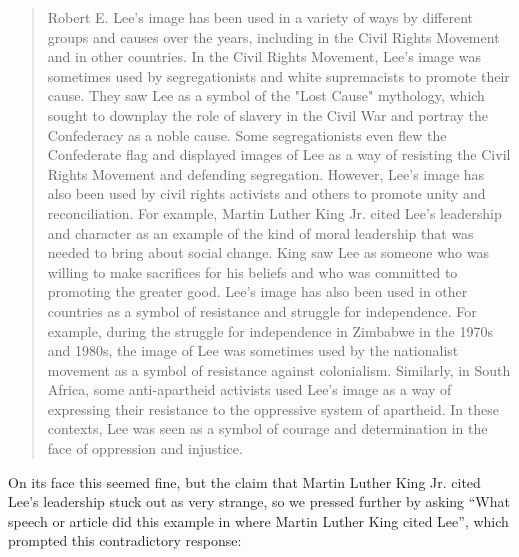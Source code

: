 \documentclass[letterpaper, 10pt, conference]{ieeeconf}
\begin{document}
    \begin{quote}
        
    Robert E. Lee's image has been used in a variety of ways by different groups and causes over the years, including in the
    Civil Rights Movement and in other countries. In the Civil Rights Movement, Lee's image was sometimes used by
    segregationists and white supremacists to promote their cause. They saw Lee as a symbol of the "Lost Cause" mythology,
    which sought to downplay the role of slavery in the Civil War and portray the Confederacy as a noble cause. Some
    segregationists even flew the Confederate flag and displayed images of Lee as a way of resisting the Civil Rights
    Movement and defending segregation. However, Lee's image has also been used by civil rights activists and others to
    promote unity and reconciliation. For example, Martin Luther King Jr. cited Lee's leadership and character as an
    example of the kind of moral leadership that was needed to bring about social change. King saw Lee as someone who
    was willing to make sacrifices for his beliefs and who was committed to promoting the greater good. Lee's image has
    also been used in other countries as a symbol of resistance and struggle for independence. For example, during the
    struggle for independence in Zimbabwe in the 1970s and 1980s, the image of Lee was sometimes used by the nationalist
    movement as a symbol of resistance against colonialism. Similarly, in South Africa, some anti-apartheid activists used
    Lee's image as a way of expressing their resistance to the oppressive system of apartheid. In these contexts, Lee was seen
    as a symbol of courage and determination in the face of oppression and injustice\cite{navarburnett2023}.
    \end{quote}
    On its face this seemed fine, but the claim that Martin Luther King Jr. cited Lee’s leadership stuck out as very strange, so we
    pressed further by asking “What speech or article did this example in where Martin Luther King cited Lee”, which prompted this
    contradictory response:
\end{document}
